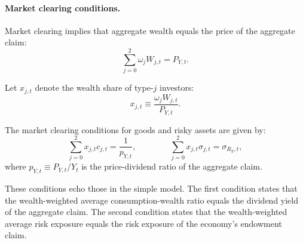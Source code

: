 \documentclass[12pt,english]{article}
\begin{document}
\paragraph{Market clearing conditions.}

Market clearing implies that aggregate wealth equals the price of the aggregate claim:
\begin{equation}
    \sum_{j=0}^2 \omega_j W_{j,t} = P_{Y,t}.
\end{equation}

Let $x_{j,t}$ denote the wealth share of type-$j$ investors:
\begin{equation}\nonumber
    x_{j,t} \equiv \frac{\omega_j W_{j,t}}{P_{Y,t}}.
\end{equation}

The market clearing conditions for goods and risky assets are given by:
\begin{equation}
    \sum_{j=0}^2 x_{j,t} c_{j,t} = \frac{1}{p_{Y,t}},
    \qquad \qquad 
    \sum_{j=0}^2 x_{j,t} \sigma_{j,t} = \sigma_{R_Y,t},
\end{equation}
where $p_{Y,t} \equiv P_{Y,t}/Y_t$ is the price-dividend ratio of the aggregate claim.

These conditions echo those in the simple model. 
The first condition states that the wealth-weighted average consumption-wealth ratio equals the dividend yield of the aggregate claim.
The second condition states that the wealth-weighted average risk exposure equals the risk exposure of the economy's endowment claim.

\end{document}
